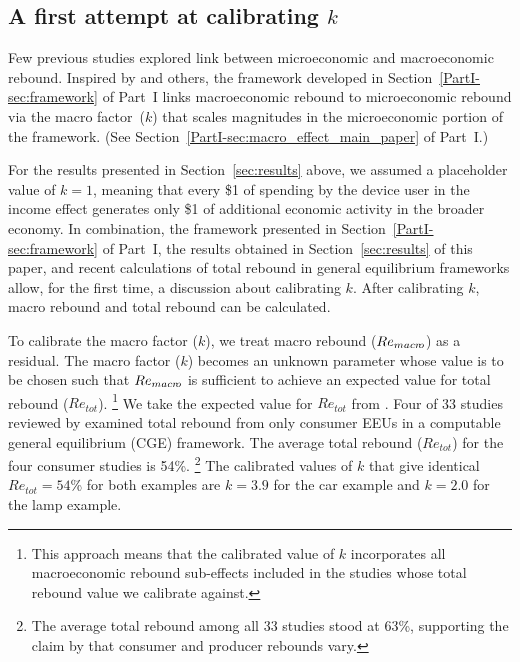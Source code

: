 \documentclass[12pt]{article}\usepackage[]{graphicx}\usepackage[]{xcolor}
\begin{document}
\subsection{A first attempt at calibrating $k$}
\label{sec:calibrating_k}



Few previous studies explored link 
between microeconomic and macroeconomic rebound.
Inspired by \citet{Borenstein:2015aa} and others, 
the framework developed in Section~\ref{PartI-sec:framework} of Part~I
links macroeconomic rebound to microeconomic rebound 
via the macro factor~($k$) that scales
magnitudes in the microeconomic portion of the framework. 
(See Section~\ref{PartI-sec:macro_effect_main_paper} of Part~I.)

For the results presented in Section~\ref{sec:results} above, 
we assumed a placeholder value of $k = 1$,
meaning that every \$1 of spending by the device user in the income effect
generates only \$1 of additional economic activity in the broader economy.
In combination, the framework presented in Section~\ref{PartI-sec:framework} of Part~I, 
the results obtained in Section~\ref{sec:results} of this paper, and
recent calculations of total rebound in general equilibrium frameworks allow, 
for the first time, 
a discussion about calibrating $k$.
After calibrating $k$, 
macro rebound and total rebound can be calculated.

To calibrate the macro factor ($k$),
we treat macro rebound ($Re_{macr\!o}$) as a residual.
The macro factor ($k$) becomes an unknown parameter whose value is to be chosen
such that $Re_{macr\!o}$
is sufficient to achieve an expected value for total rebound ($Re_{tot}$).%
\footnote{
  This approach means that the calibrated value of $k$ incorporates all 
  macroeconomic rebound sub-effects included in the studies
  whose total rebound value we calibrate against.
}
%
We take the expected value for $Re_{tot}$ from 
\citet{Brockway:2021ww}.
Four of 33 studies reviewed by \citet{Brockway:2021ww}
examined total rebound from only consumer EEUs in a computable general
equilibrium (CGE) framework. 
The average total rebound ($Re_{tot}$) 
for the four consumer studies is 54\%.%
\footnote{
  The average total rebound among all 33 studies stood at 63\%,
  supporting the claim by \citet{Turner:2013aa} that consumer
  and producer rebounds vary.
}
%
The calibrated values of $k$ that give identical 
$Re_{tot} = 54$\% 
for both examples are
$k = 3.9$
for the car example and
$k = 2.0$ 
for the lamp example.
\end{document}
